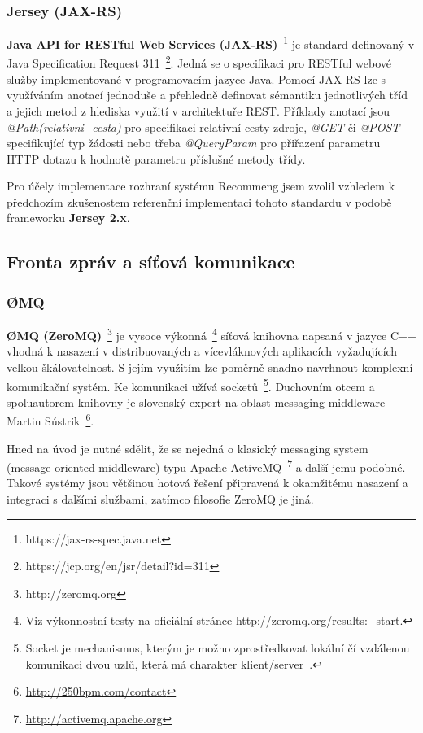 \documentclass[thesis=M,czech]{FITthesis}[2014/05/07]
\begin{document}
\subsubsection{Jersey (JAX-RS)}
\textbf{Java API for RESTful Web Services (JAX-RS)}~\footnote{https://jax-rs-spec.java.net} je standard definovaný v Java Specification Request 311~\footnote{https://jcp.org/en/jsr/detail?id=311}. Jedná se o specifikaci pro RESTful webové služby implementované v programovacím jazyce Java. Pomocí JAX-RS lze s využíváním anotací jednoduše a přehledně definovat sémantiku jednotlivých tříd a jejich metod z hlediska využití v architektuře REST. Příklady anotací jsou \emph{@Path(relativni\_cesta)} pro specifikaci relativní cesty zdroje, \emph{@GET} či \emph{@POST} specifikující typ žádosti nebo třeba \emph{@QueryParam} pro přiřazení parametru HTTP dotazu k hodnotě parametru příslušné metody třídy.

Pro účely implementace rozhraní systému Recommeng jsem zvolil vzhledem k předchozím zkušenostem referenční implementaci tohoto standardu v podobě frameworku \textbf{Jersey 2.x}. 

\subsection{Fronta zpráv a síťová komunikace}

\subsubsection{ØMQ}
\textbf{ØMQ (ZeroMQ)}~\footnote{http://zeromq.org} je vysoce výkonná~\footnote{Viz výkonnostní testy na oficiální stránce \url{http://zeromq.org/results:_start}.} síťová knihovna napsaná v jazyce C++ vhodná k nasazení v distribuovaných a vícevláknových aplikacích vyžadujících velkou škálovatelnost. S jejím využitím lze poměrně snadno navrhnout komplexní komunikační systém. Ke komunikaci užívá socketů~\footnote{Socket je mechanismus, kterým je možno zprostředkovat lokální čí vzdálenou komunikaci dvou uzlů, která má charakter klient/server~\cite{socket}.}. Duchovním otcem a spoluautorem knihovny je slovenský expert na oblast messaging middleware Martin Sústrik~\footnote{\url{http://250bpm.com/contact}}.

Hned na úvod je nutné sdělit, že se nejedná o klasický messaging system (message-oriented middleware) typu Apache ActiveMQ~\footnote{\url{http://activemq.apache.org}} a další jemu podobné. Takové systémy jsou většinou hotová řešení připravená k okamžitému nasazení a integraci s dalšími službami, zatímco filosofie ZeroMQ je jiná.
\end{document}
